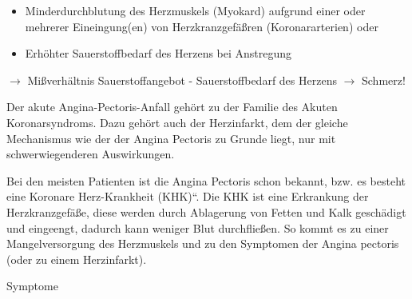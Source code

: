 \documentclass{article}
\begin{document}
\begin{itemize}
\item Minderdurchblutung des Herzmuskels (Myokard) aufgrund einer oder
mehrerer Eineingung(en) von Herzkranzgef\"a{\ss}ren (Koronararterien)
oder

\item Erh\"ohter Sauerstoffbedarf des Herzens bei Anstregung

\end{itemize}
${\rightarrow}$ Mi{\ss}verh\"altnis Sauerstoffangebot - 
Sauerstoffbedarf des Herzens ${\rightarrow}$ Schmerz!

Der akute Angina-Pectoris-Anfall geh\"ort zu der Familie des Akuten
Koronarsyndroms. Dazu geh\"ort auch der Herzinfarkt, dem der gleiche
Mechanismus wie der der Angina Pectoris zu Grunde liegt, nur mit
schwer\-wiegenderen Auswirkungen. 

Bei den meisten Patienten ist die Angina Pectoris schon bekannt, bzw. es
besteht eine {\quotedblbase}Koronare
Herz-Krankheit (KHK){\textquotedblleft}. Die KHK ist eine
Erkrankung der Herzkranzgef\"a{\ss}e, diese werden durch Ablagerung von
Fetten und Kalk gesch\"adigt und eingeengt, dadurch kann weniger Blut
durchflie{\ss}en. So kommt es zu einer Mangelversorgung des Herzmuskels
und zu den Symptomen der Angina pectoris (oder zu einem Herzinfarkt). 

Symptome
\end{document}
